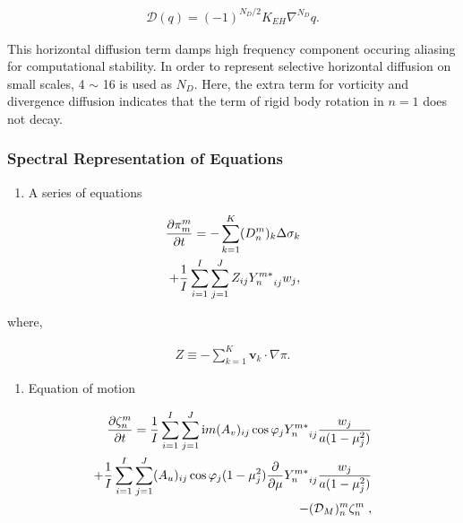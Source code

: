 \begin{eqnarray}
    {\mathcal D}(q) = (-1)^{N_D/2} K_{EH} \nabla^{N_D} q .
\end{eqnarray}

This horizontal diffusion term damps high frequency component occuring aliasing for computational stability. In order to represent selective horizontal diffusion on small scales, 4 \(\sim\) 16 is used
as \(N_D\). Here, the extra term for vorticity and divergence diffusion indicates that the term of rigid body rotation in \(n=1\) does not decay.

\hypertarget{spectral-representation-of-equations}{%
\subsubsection{Spectral Representation of Equations}\label{spectral-representation-of-equations}}

\begin{enumerate}
\def\labelenumi{\arabic{enumi}.}
\tightlist
\item
  A series of equations
\end{enumerate}

\begin{eqnarray}
  \frac{\partial{\pi_m^m}}{\partial {t}}
  =  - \sum_{k=1}^{K} (D_n^m)_k \Delta  \sigma_k  \notag\\
     + \frac{1}{I} \sum_{i=1}^{I} \sum_{j=1}^{J}  
               Z_{ij} {Y_n^{m *}}_{ij} w_j  ,
\end{eqnarray}

where,

\begin{eqnarray}
Z \equiv - \sum_{k=1}^{K} \mathbf{v}_k \cdot \nabla \pi .
\end{eqnarray}

\begin{enumerate}
\def\labelenumi{\arabic{enumi}.}
\setcounter{enumi}{1}
\tightlist
\item
  Equation of motion
\end{enumerate}

\begin{eqnarray}
  \frac{\partial{\zeta_n^m}}{\partial {t}}
    =  \frac{1}{I} \sum_{i=1}^{I} \sum_{j=1}^{J}  
          \mathrm{i}m (A_v)_{ij} \cos\varphi_j
          {Y_n^{m *}}_{ij}
         \frac{w_j}{a(1-\mu_j^{2})}
         \notag\\
    +    \frac{1}{I} \sum_{i=1}^{I} \sum_{j=1}^{J}  
          (A_u)_{ij} \cos\varphi_j
          (1-\mu_j^2)
          \frac{\partial }{\partial \mu} {Y_n^{m *}}_{ij}
          \frac{w_j}{a(1-\mu_j^{2})}
          \notag\\
    -   ({\mathcal D}_M)_n^m \zeta_n^m  \; ,
\end{eqnarray}

